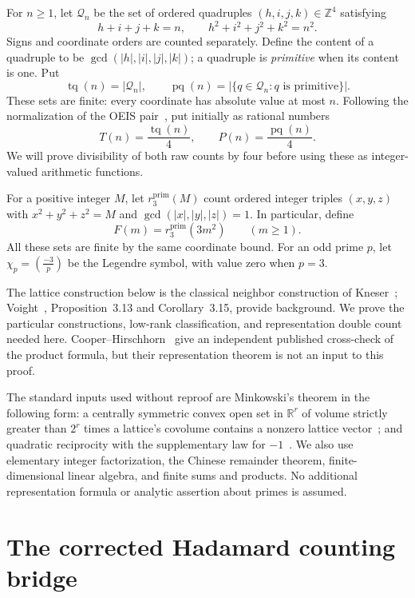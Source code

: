 \documentclass[11pt]{article}
\theoremstyle{remark}
\newcommand{\Z}{\mathbb Z}
\newcommand{\R}{\mathbb R}
\newcommand{\leg}[2]{\left(\frac{#1}{#2}\right)}
\newcommand{\pp}{\operatorname{pq}}
\newcommand{\ttq}{\operatorname{tq}}
\begin{document}
For $n\geq1$, let $\mathcal Q_n$ be the set of ordered quadruples
$(h,i,j,k)\in\Z^4$ satisfying
\begin{equation}\label{eq:quad}
 h+i+j+k=n,\qquad h^2+i^2+j^2+k^2=n^2.
\end{equation}
Signs and coordinate orders are counted separately. Define the content of a
quadruple to be $\gcd(|h|,|i|,|j|,|k|)$; a quadruple is \emph{primitive}
when its content is one. Put
\[
 \ttq(n)=|\mathcal Q_n|,\qquad
 \pp(n)=|\{q\in\mathcal Q_n:q\text{ is primitive}\}|.
\]
These sets are finite: every coordinate has absolute value at most $n$.
Following the normalization of the OEIS pair~\cite{oeis-total,oeis-primitive},
put initially as rational numbers
\begin{equation}\label{eq:normalized}
 T(n)=\frac{\ttq(n)}4,\qquad P(n)=\frac{\pp(n)}4.
\end{equation}
We will prove divisibility of both raw counts by four before using these as
integer-valued arithmetic functions.

For a positive integer $M$, let $r_3^{\mathrm{prim}}(M)$ count ordered
integer triples $(x,y,z)$ with $x^2+y^2+z^2=M$ and
$\gcd(|x|,|y|,|z|)=1$. In particular, define
\[
 F(m)=r_3^{\mathrm{prim}}(3m^2)\qquad(m\geq1).
\]
All these sets are finite by the same coordinate bound. For an odd prime
$p$, let $\chi_p=\leg{-3}{p}$ be the Legendre symbol, with value zero when
$p=3$.

The lattice construction below is the classical neighbor construction of
Kneser~\cite{kneser}; Voight~\cite{voight}, Proposition~3.13 and
Corollary~3.15, provide background. We prove the particular constructions,
low-rank classification, and representation double count needed here.
Cooper--Hirschhorn~\cite{cooper-hirschhorn} give an independent published
cross-check of the product formula, but their representation theorem is not
an input to this proof.

The standard inputs used without reproof are Minkowski's theorem in the
following form: a centrally symmetric convex open set in $\R^r$ of volume
strictly greater than $2^r$ times a lattice's covolume contains a nonzero
lattice vector~\cite{minkowski}; and quadratic reciprocity with the
supplementary law for $-1$~\cite{gauss}. We also use elementary integer
factorization, the Chinese remainder theorem, finite-dimensional linear
algebra, and finite sums and products. No additional representation formula
or analytic assertion about primes is assumed.

\section{The corrected Hadamard counting bridge}
\end{document}
